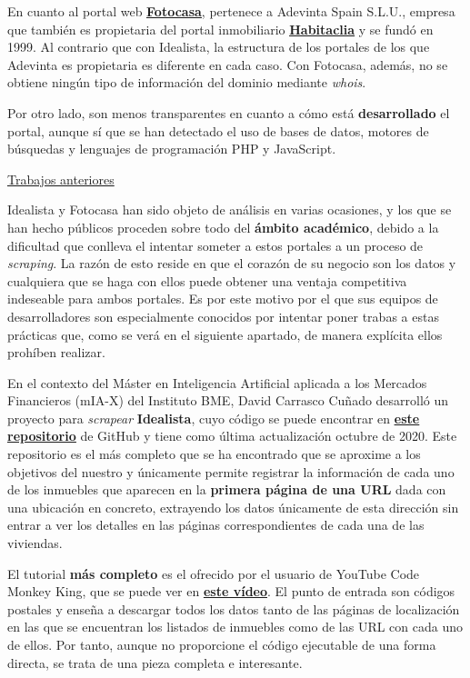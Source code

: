 \documentclass[12pt]{article}
\begin{document}
En cuanto al portal web \href{https://www.fotocasa.es/es/}{\textbf{\underline{Fotocasa}}}, pertenece a Adevinta Spain S.L.U., empresa que también es propietaria del portal inmobiliario \href{https://www.habitaclia.com/madrid}{\textbf{\underline{Habitaclia}}} y se fundó en 1999. Al contrario que con Idealista, la estructura de los portales de los que Adevinta es propietaria es diferente en cada caso. Con Fotocasa, además, no se obtiene ningún tipo de información del dominio mediante \textit{whois}. 

Por otro lado, son menos transparentes en cuanto a cómo está \textbf{desarrollado} el portal, aunque sí que se han detectado el uso de bases de datos, motores de búsquedas y lenguajes de programación PHP y JavaScript.

\underline{Trabajos anteriores}

Idealista y Fotocasa han sido objeto de análisis en varias ocasiones, y los que se han hecho públicos proceden sobre todo del \textbf{ámbito académico}, debido a la dificultad que conlleva el intentar someter a estos portales a un proceso de \textit{scraping}. La razón de esto reside en que el corazón de su negocio son los datos y cualquiera que se haga con ellos puede obtener una ventaja competitiva indeseable para ambos portales. Es por este motivo por el que sus equipos de desarrolladores son especialmente conocidos por intentar poner trabas a estas prácticas que, como se verá en el siguiente apartado, de manera explícita ellos prohíben realizar.

En el contexto del Máster en Inteligencia Artificial aplicada a los Mercados Financieros (mIA-X) del Instituto BME, David Carrasco Cuñado desarrolló un proyecto para \textit{scrapear} \textbf{Idealista}, cuyo código se puede encontrar en \href{https://github.com/David-Carrasco/Scrapy-Idealista}{\textbf{\underline{este repositorio}}} de GitHub y tiene como última actualización octubre de 2020. Este repositorio es el más completo que se ha encontrado que se aproxime a los objetivos del nuestro y únicamente permite registrar la información de cada uno de los inmuebles que aparecen en la\textbf{ primera página de una URL} dada con una ubicación en concreto, extrayendo los datos únicamente de esta dirección sin entrar a ver los detalles en las páginas correspondientes de cada una de las viviendas. 

El tutorial\textbf{ más completo} es el ofrecido por el usuario de YouTube Code Monkey King, que se puede ver en \href{https://www.youtube.com/watch?v=4Tv73KuqgVo}{\textbf{\underline{este vídeo}}}. El punto de entrada son códigos postales y enseña a descargar todos los datos tanto de las páginas de localización en las que se encuentran los listados de inmuebles como de las URL con cada uno de ellos. Por tanto, aunque no proporcione el código ejecutable de una forma directa, se trata de una pieza completa e interesante. 
\end{document}
